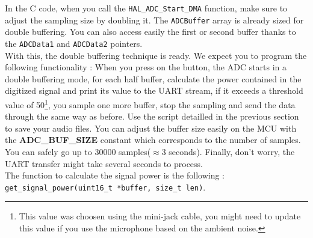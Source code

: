 
\noindent In the C code, when you call the \texttt{HAL\_ADC\_Start\_DMA} function, make sure to adjust the sampling size by doubling it. The \texttt{ADCBuffer} array is already sized for double buffering. You can also access easily the first or second buffer thanks to the \texttt{ADCData1} and \texttt{ADCData2} pointers.\\

\noindent With this, the double buffering technique is ready. We expect you to program the following functionality : When you press on the button, the ADC starts in a double buffering mode, for each half buffer, calculate the power contained in the digitized signal and print its value to the UART stream, if it exceeds a threshold value of 50\footnote{This value was choosen using the mini-jack cable, you might need to update this value if you use the microphone based on the ambient noise.}, you sample one more buffer, stop the sampling and send the data through the same way as before. Use the script detailled in the previous section to save your audio files. You can adjust the buffer size easily on the MCU with the \textbf{ADC\_BUF\_SIZE} constant which corresponds to the number of samples. You can safely go up to 30000 samples($\approx$3 seconds). Finally, don't worry, the UART transfer might take several seconds to process. \\

\noindent The function to calculate the signal power is the following : \texttt{get\_signal\_power(uint16\_t *buffer, size\_t len)}.


